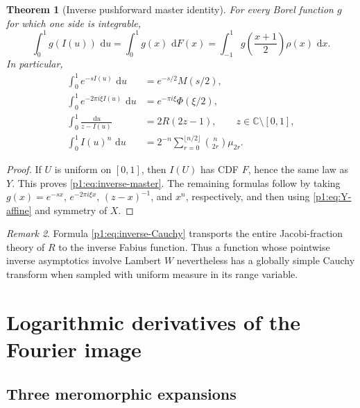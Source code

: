 \documentclass[11pt]{article}
\newtheorem{theorem}{Theorem}[section]
\theoremstyle{definition}
\theoremstyle{remark}
\newtheorem{remark}[theorem]{Remark}
\newcommand{\C}{\mathbb C}
\newcommand{\dd}{\,\mathrm d}
\begin{document}
\begin{theorem}[Inverse pushforward master identity]\label{p1:thm:inverse-pushforward}
For every Borel function \(g\) for which one side is integrable,
\begin{equation}
 \boxed{
 \int_0^1g(I(u))\,\dd u
 =\int_0^1g(x)\,\dd F(x)
 =\int_{-1}^{1}g\!\left(\frac{x+1}{2}\right)\rho(x)\,\dd x.
 }                                                           \label{p1:eq:inverse-master}
\end{equation}
In particular,
\begin{align}
 \int_0^1 e^{-sI(u)}\,\dd u
 &=e^{-s/2}M(s/2),                                           \label{p1:eq:inverse-Laplace}\\
 \int_0^1 e^{-2\pi i\xi I(u)}\,\dd u
 &=e^{-\pi i\xi}\Phi(\xi/2),                              \label{p1:eq:inverse-Fourier}\\
 \int_0^1\frac{\dd u}{z-I(u)}
 &=2R(2z-1),\qquad z\in\C\setminus[0,1],                   \label{p1:eq:inverse-Cauchy}\\
 \int_0^1I(u)^n\,\dd u
 &=2^{-n}\sum_{r=0}^{\lfloor n/2\rfloor}
   \binom{n}{2r}\mu_{2r}.                                   \label{p1:eq:inverse-moments}
\end{align}
\end{theorem}

\begin{proof}
If \(U\) is uniform on \([0,1]\), then \(I(U)\) has CDF \(F\), hence the same law as
\(Y\).  This proves \eqref{p1:eq:inverse-master}.  The remaining formulas follow by taking
\(g(x)=e^{-sx}\), \(e^{-2\pi i\xi x}\), \((z-x)^{-1}\), and \(x^n\), respectively,
and then using \eqref{p1:eq:Y-affine} and symmetry of \(X\).
\end{proof}

\begin{remark}
Formula \eqref{p1:eq:inverse-Cauchy} transports the entire Jacobi-fraction theory of \(R\) to
the inverse Fabius function.  Thus a function whose pointwise inverse asymptotics involve
Lambert \(W\) nevertheless has a globally simple Cauchy transform when sampled with
uniform measure in its range variable.
\end{remark}

\section{Logarithmic derivatives of the Fourier image}

\subsection{Three meromorphic expansions}
\end{document}
